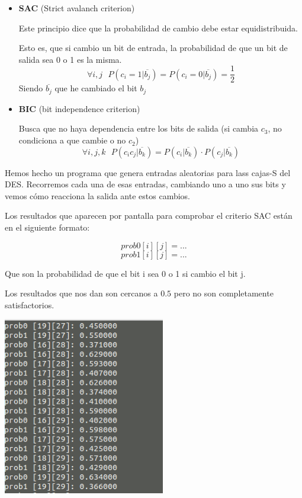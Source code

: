 \documentclass{apuntes}
\begin{document}
\begin{itemize}
	
	\item \textbf{SAC} (Strict avalanch criterion)
	
	Este principio dice que la probabilidad de cambio debe estar equidistribuida.
	
	Esto es, que si cambio un bit de entrada, la probabilidad de que un bit de salida sea 0 o 1 es la misma.
	$$\forall i,j\text{  }P(c_i=1|\overline{b_j})= P(c_i=0|\overline{b_j}) = \frac{1}{2}$$
	Siendo $\overline{b_j}$ que he cambiado el bit $b_j$
	
	\item \textbf{BIC} (bit independence criterion)
	
	Busca que no haya dependencia entre los bits de salida (si cambia $c_3$, no condiciona a que cambie o no $c_2$) 
	$$\forall i,j,k \text{  } P(c_ic_j|\overline{b_k}) = P(c_i|\overline{b_k})\cdot P(c_j|\overline{b_k})$$
\end{itemize} 	

Hemos hecho un programa que genera entradas aleatorias para lass cajas-S del DES.
Recorremos cada una de esas entradas, cambiando uno a uno sus bits y vemos cómo reacciona la salida ante estos cambios.

Los resultados que aparecen por pantalla para comprobar el criterio SAC están en el siguiente formato:

$$prob0[i][j] = ...$$
$$prob1[i][j] = ...$$

Que son la probabilidad de que el bit i sea 0 o 1 si cambio el bit j.

Los resultados que nos dan son cercanos a $0.5$ pero no son completamente satisfactorios.

\begin{center}
	\includegraphics[width=200pt]{SACBIC_DESmod.png}
\end{center}
\end{document}

